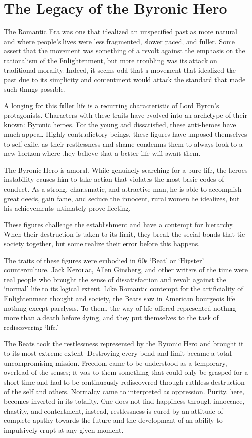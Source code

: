 \section{The Legacy of the Byronic Hero}

The Romantic Era was one that idealized an unspecified past as more natural and where people's lives were less fragmented, slower paced, and fuller. Some assert that the movement was something of a revolt against the emphasis on the rationalism of the Enlightenment, but more troubling was its attack on traditional morality. Indeed, it seems odd that a movement that idealized the past due to its simplicity and contentment would attack the standard that made such things possible.

A longing for this fuller life is a recurring characteristic of Lord Byron's protagonists. Characters with these traits have evolved into an archetype of their known: Byronic heroes. For the young and dissatisfied, these anti-heroes have much appeal. Highly contradictory beings, these figures have imposed themselves to self-exile, as their restlessness and shame condemns them to always look to a new horizon where they believe that a better life will await them.

The Byronic Hero is amoral. While genuinely searching for a pure life, the heroes instability causes him to take action that violates the most basic codes of conduct. As a strong, charismatic, and attractive man, he is able to accomplish great deeds, gain fame, and seduce the innocent, rural women he idealizes, but his achievements ultimately prove fleeting.

These figures challenge the establishment and have a contempt for hierarchy. When their destruction is taken to its limit, they break the social bonds that tie society together, but some realize their error before this happens.

The traits of these figures were embodied in 60s `Beat' or `Hipster' counterculture. Jack Kerouac, Allen Ginsberg, and other writers of the time were real people who brought the sense of dissatisfaction and revolt against the `normal' life to its logical extent. Like Romantic contempt for the artificiality of Enlightenment thought and society, the Beats saw in American bourgeois life nothing except paralysis. To them, the way of life offered represented nothing more than a death before dying, and they put themselves to the task of rediscovering `life.'

The Beats took the restlessness represented by the Byronic Hero and brought it to its most extreme extent. Destroying every bond and limit became a total, uncompromising mission. Freedom came to be understood as a temporary, overload of the senses; it was to them something that could only be grasped for a short time and had to be continuously rediscovered through ruthless destruction of the self and others. Normalcy came to interpreted as oppression. Purity, here, becomes inverted in its totality. One does not find happiness through innocence, chastity, and contentment, instead, restlessness is cured by an attitude of complete apathy towards the future and the development of an ability to impulsively erupt at any given moment.

